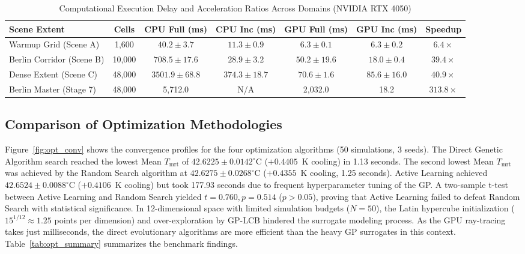 \documentclass[conference]{IEEEtran}
\newcommand{\Tmrt}{T_{\mathrm{mrt}}}
\begin{document}
\begin{table}[!t]
\caption{Computational Execution Delay and Acceleration Ratios Across Domains (NVIDIA RTX 4050)}
\label{tab:perf_benchmarks}
\centering
\renewcommand{\arraystretch}{1.12}
\setlength{\tabcolsep}{4pt}
\begin{tabular}{@{}lcccccc@{}}
\toprule
\textbf{Scene Extent} & \textbf{Cells} & \textbf{CPU Full (ms)} & \textbf{CPU Inc (ms)} & \textbf{GPU Full (ms)} & \textbf{GPU Inc (ms)} & \textbf{Speedup} \\
\midrule
Warmup Grid (Scene A) & 1,600 & $40.2 \pm 3.7$ & $11.3 \pm 0.9$ & $6.3 \pm 0.1$ & $6.3 \pm 0.2$ & $6.4\times$ \\
Berlin Corridor (Scene B) & 10,000 & $708.5 \pm 17.6$ & $28.9 \pm 3.2$ & $50.2 \pm 19.6$ & $18.0 \pm 0.4$ & $39.4\times$ \\
Dense Extent (Scene C) & 48,000 & $3501.9 \pm 68.8$ & $374.3 \pm 18.7$ & $70.6 \pm 1.6$ & $85.6 \pm 16.0$ & $40.9\times$ \\
Berlin Master (Stage 7) & 48,000 & 5,712.0 & N/A & 2,032.0 & 18.2 & $313.8\times$ \\
\bottomrule
\end{tabular}
\end{table}

\subsection{Comparison of Optimization Methodologies}
Figure~\ref{fig:opt_conv} shows the convergence profiles for the four optimization algorithms (50 simulations, 3 seeds). The Direct Genetic Algorithm search reached the lowest Mean $\Tmrt$ of $42.6225 \pm 0.0142^\circ\mathrm{C}$ ($+0.4405$~K cooling) in 1.13 seconds. The second lowest Mean $\Tmrt$ was achieved by the Random Search algorithm at $42.6275 \pm 0.0268^\circ\mathrm{C}$ ($+0.4355$~K cooling, 1.25 seconds). Active Learning achieved $42.6524 \pm 0.0088^\circ\mathrm{C}$ ($+0.4106$~K cooling) but took 177.93 seconds due to frequent hyperparameter tuning of the GP. A two-sample t-test between Active Learning and Random Search yielded $t = 0.760, p = 0.514$ ($p > 0.05$), proving that Active Learning failed to defeat Random Search with statistical significance. In 12-dimensional space with limited simulation budgets ($N = 50$), the Latin hypercube initialization ($15^{1/12} \approx 1.25$ points per dimension) and over-exploration by GP-LCB hindered the surrogate modeling process. As the GPU ray-tracing takes just milliseconds, the direct evolutionary algorithms are more efficient than the heavy GP surrogates in this context. Table~\ref{tab:opt_summary} summarizes the benchmark findings.
\end{document}
